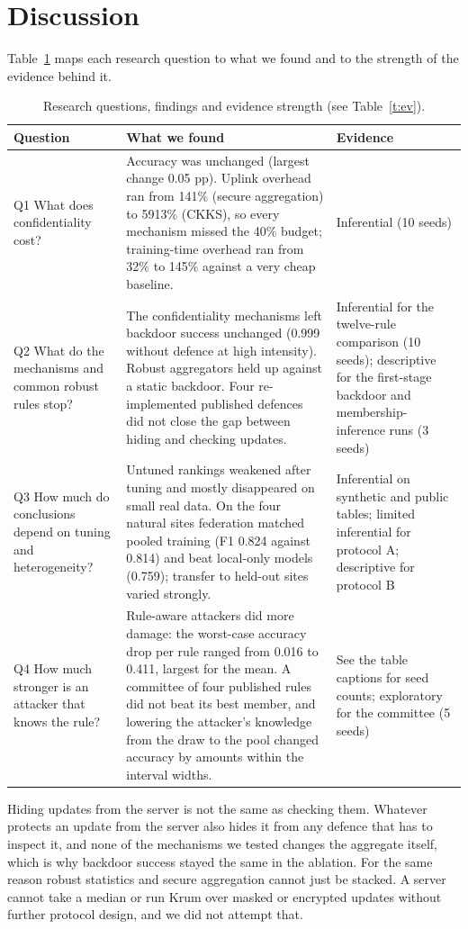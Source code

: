 \documentclass[conference]{IEEEtran}
\begin{document}
\section{Discussion}
Table~\ref{t:q} maps each research question to what we found and to the strength of the evidence behind it.
\begin{table}[t]\centering\caption{Research questions, findings and evidence strength (see Table~\ref{t:ev}).}\label{t:q}\scriptsize\setlength{\tabcolsep}{3pt}
\begin{tabular}{p{3.0cm}p{9.6cm}p{4.0cm}}\toprule
Question & What we found & Evidence\\\midrule
Q1 What does confidentiality cost? & Accuracy was unchanged (largest change 0.05 pp). Uplink overhead ran from 141\% (secure aggregation) to 5913\% (CKKS), so every mechanism missed the 40\% budget; training-time overhead ran from 32\% to 145\% against a very cheap baseline. & Inferential (10 seeds)\\
Q2 What do the mechanisms and common robust rules stop? & The confidentiality mechanisms left backdoor success unchanged (0.999 without defence at high intensity). Robust aggregators held up against a static backdoor. Four re-implemented published defences did not close the gap between hiding and checking updates. & Inferential for the twelve-rule comparison (10 seeds); descriptive for the first-stage backdoor and membership-inference runs (3 seeds)\\
Q3 How much do conclusions depend on tuning and heterogeneity? & Untuned rankings weakened after tuning and mostly disappeared on small real data. On the four natural sites federation matched pooled training (F1 0.824 against 0.814) and beat local-only models (0.759); transfer to held-out sites varied strongly. & Inferential on synthetic and public tables; limited inferential for protocol A; descriptive for protocol B\\
Q4 How much stronger is an attacker that knows the rule? & Rule-aware attackers did more damage: the worst-case accuracy drop per rule ranged from 0.016 to 0.411, largest for the mean. A committee of four published rules did not beat its best member, and lowering the attacker's knowledge from the draw to the pool changed accuracy by amounts within the interval widths. & See the table captions for seed counts; exploratory for the committee (5 seeds)\\\bottomrule\end{tabular}\end{table}
Hiding updates from the server is not the same as checking them. Whatever protects an update from the server also hides it from any defence that has to inspect it, and none of the mechanisms we tested changes the aggregate itself, which is why backdoor success stayed the same in the ablation. For the same reason robust statistics and secure aggregation cannot just be stacked. A server cannot take a median or run Krum over masked or encrypted updates without further protocol design, and we did not attempt that.
\end{document}
